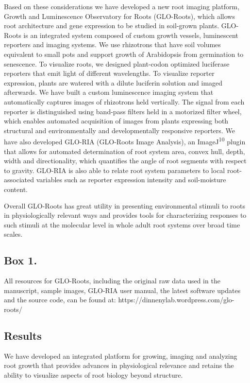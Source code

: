 \documentclass[]{article}
\begin{document}
Based on these considerations we have developed a new root imaging
platform, Growth and Luminescence Observatory for Roots (GLO-Roots),
which allows root architecture and gene expression to be studied in
soil-grown plants. GLO-Roots is an integrated system composed of custom
growth vessels, luminescent reporters and imaging systems. We use
rhizotrons that have soil volumes equivalent to small pots and support
growth of Arabidopsis from germination to senescence. To visualize
roots, we designed plant-codon optimized luciferase reporters that emit
light of different wavelengths. To visualize reporter expression, plants
are watered with a dilute luciferin solution and imaged afterwards. We
have built a custom luminescence imaging system that automatically
captures images of rhizotrons held vertically. The signal from each
reporter is distinguished using band-pass filters held in a motorized
filter wheel, which enables automated acquisition of images from plants
expressing both structural and environmentally and developmentally
responsive reporters. We have also developed GLO-RIA (GLO-Roots Image
Analysis), an ImageJ\textsuperscript{10} plugin that allows for
automated determination of root system area, convex hull, depth, width
and directionality, which quantifies the angle of root segments with
respect to gravity. GLO-RIA is also able to relate root system
parameters to local root-associated variables such as reporter
expression intensity and soil-moisture content.

Overall GLO-Roots has great utility in presenting environmental stimuli
to roots in physiologically relevant ways and provides tools for
characterizing responses to such stimuli at the molecular level in whole
adult root systems over broad time scales.

\subsection{Box 1.}\label{box-1.}

All resources for GLO-Roots, including the original raw data used in the
manuscript, sample images, GLO-RIA user manual, the latest software
updates and the source code, can be found at:
https://dinnenylab.wordpress.com/glo-roots/

\subsection{Results}\label{results}

We have developed an integrated platform for growing, imaging and
analyzing root growth that provides advances in physiological relevance
and retains the ability to visualize aspects of root biology beyond
structure.
\end{document}
